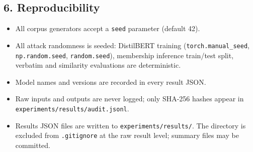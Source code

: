 \subsection{6. Reproducibility}\label{reproducibility}

\begin{itemize}
\tightlist
\item
  All corpus generators accept a \texttt{seed} parameter (default 42).
\item
  All attack randomness is seeded: DistilBERT training
  (\texttt{torch.manual\_seed}, \texttt{np.random.seed},
  \texttt{random.seed}), membership inference train/test split, verbatim
  and similarity evaluations are deterministic.
\item
  Model names and versions are recorded in every result JSON.
\item
  Raw inputs and outputs are never logged; only SHA-256 hashes appear in
  \texttt{experiments/results/audit.jsonl}.
\item
  Results JSON files are written to \texttt{experiments/results/}. The
  directory is excluded from \texttt{.gitignore} at the raw result
  level; summary files may be committed.
\end{itemize}
